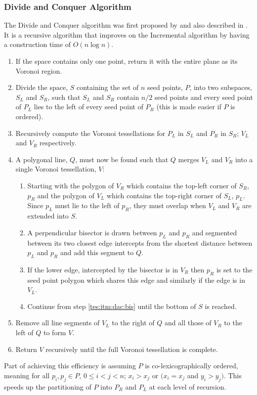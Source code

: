 \subsubsection{Divide and Conquer Algorithm}\label{tes:ssec:dac}
The Divide and Conquer algorithm was first proposed by \citet{shamos1975closest} and also described in \citet{okabe2009spatial}. It is a recursive algorithm that improves on the Incremental algorithm by having a construction time of $O(n\log n)$.
\begin{enumerate}
\item If the space contains only one point, return it with the entire plane as its Voronoi region.
\item Divide the space, $S$ containing the set of $n$ seed points, $P$, into two subspaces, $S_L$ and $S_R$, such that $S_L$ and $S_R$ contain $n/2$ seed points and every seed point of $P_L$ lies to the left of every seed point of $P_R$ (this is made easier if $P$ is ordered).
\item Recursively compute the Voronoi tessellations for $P_L$ in $S_L$ and $P_R$ in $S_R$; $V_L$ and $V_R$ respectively.
\item A polygonal line, $Q$, must now be found such that $Q$ merges $V_L$ and $V_R$ into a single Voronoi tessellation, $V$:
\begin{enumerate}
 \item Starting with the polygon of $V_R$ which contains the top-left corner of $S_R$, $p_R$ and the polygon of $V_L$ which contains the top-right corner of $S_L$, $p_L$. Since $p_L$ must lie to the left of $p_R$, they must overlap when $V_L$ and $V_R$ are extended into $S$.
 \item\label{tes:itm:dac:bis} A perpendicular bisector is drawn between $p_L$ and $p_R$ and segmented between its two closest edge intercepts from the shortest distance between $p_L$ and $p_R$ and add this segment to $Q$.
 \item If the lower edge, intercepted by the bisector is in $V_R$ then $p_R$ is set to the seed point polygon which shares this edge and similarly if the edge is in $V_L$.
 \item Continue from step \ref{tes:itm:dac:bis} until the bottom of $S$ is reached.
\end{enumerate}
\item Remove all line segments of $V_L$ to the right of $Q$ and all those of $V_R$ to the left of $Q$ to form $V$.
\item Return $V$ recursively until the full Voronoi tessellation is complete.
\end{enumerate}
Part of achieving this efficiency is assuming $P$ is co-lexicographically ordered, meaning for all $p_i,p_j \in P$, $0 \leq i < j < n$; $x_i > x_j$ or $(x_i = x_j$ and $y_i > y_j)$. This speeds up the partitioning of $P$ into $P_R$ and $P_L$ at each level of recursion.
%
